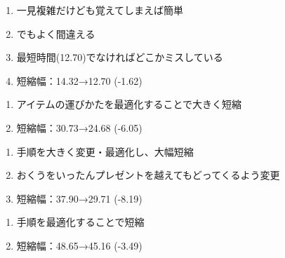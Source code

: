 \begin{enumerate}[label={\sarrow}]
\item 一見複雑だけども覚えてしまえば簡単
\item でもよく間違える
\item 最短時間(12.70)でなければどこかミスしている
\item 短縮幅：14.32→12.70 (-1.62)
\end{enumerate}



\begin{enumerate}[label={\sarrow}]
\item アイテムの運びかたを最適化することで大きく短縮
\item 短縮幅：30.73→24.68 (-6.05)
\end{enumerate}



\begin{enumerate}[label={\sarrow}]
\item 手順を大きく変更・最適化し、大幅短縮
\item おくうをいったんプレゼントを越えてもどってくるよう変更
\item 短縮幅：37.90→29.71 (-8.19)
\end{enumerate}



\clearpage
\begin{enumerate}[label={\sarrow}]
\item 手順を最適化することで短縮
\item 短縮幅：48.65→45.16 (-3.49)
\end{enumerate}



